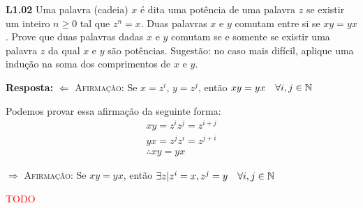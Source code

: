 
\noindent \textbf{L1.02} Uma palavra (cadeia) $x$ é dita uma potência de uma palavra $z$ se existir um inteiro $n \geq 0$ tal que $z^n = x$. Duas palavras $x$ e $y$ comutam entre si se $xy = yx$. Prove que duas palavras dadas $x$ e $y$ comutam se e somente se existir uma palavra $z$ da qual $x$ e $y$ são potências. Sugestão: no caso mais difícil, aplique uma indução na soma dos comprimentos de $x$ e $y$.

\textbf{Resposta:} $\Leftarrow$ \textsc{Afirmação:} Se $x = z^i$, $y = z^j$, então $xy = yx \quad \forall i, j \in \mathbb{N}$

Podemos provar essa afirmação da seguinte forma:
\begin{align*}
xy = z^iz^j = z^{i+j} \\
yx = z^jz^i = z^{j+i} \\
\therefore xy = yx
\end{align*}

$\Rightarrow$ \textsc{Afirmação:} Se $xy = yx$, então $\exists z | z^i = x, z^j = y \quad \forall i, j \in \mathbb{N}$

\textcolor{red}{TODO}